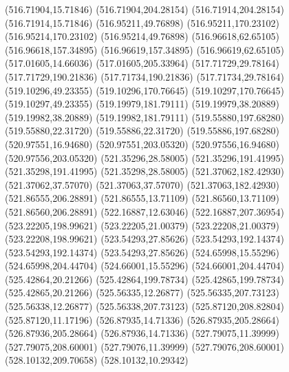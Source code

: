 {(516.71904,15.71846) (516.71904,204.28154) (516.71914,204.28154) (516.71914,15.71846) (516.95211,49.76898) (516.95211,170.23102) (516.95214,170.23102) (516.95214,49.76898)
(516.96618,62.65105) (516.96618,157.34895) (516.96619,157.34895) (516.96619,62.65105) (517.01605,14.66036) (517.01605,205.33964) (517.71729,29.78164) (517.71729,190.21836)
(517.71734,190.21836) (517.71734,29.78164) (519.10296,49.23355) (519.10296,170.76645) (519.10297,170.76645) (519.10297,49.23355) (519.19979,181.79111) (519.19979,38.20889)
(519.19982,38.20889) (519.19982,181.79111) (519.55880,197.68280) (519.55880,22.31720) (519.55886,22.31720) (519.55886,197.68280) (520.97551,16.94680) (520.97551,203.05320)
(520.97556,16.94680) (520.97556,203.05320) (521.35296,28.58005) (521.35296,191.41995) (521.35298,191.41995) (521.35298,28.58005) (521.37062,182.42930) (521.37062,37.57070)
(521.37063,37.57070) (521.37063,182.42930) (521.86555,206.28891) (521.86555,13.71109) (521.86560,13.71109) (521.86560,206.28891) (522.16887,12.63046) (522.16887,207.36954)
(523.22205,198.99621) (523.22205,21.00379) (523.22208,21.00379) (523.22208,198.99621) (523.54293,27.85626) (523.54293,192.14374) (523.54293,192.14374) (523.54293,27.85626)
(524.65998,15.55296) (524.65998,204.44704) (524.66001,15.55296) (524.66001,204.44704) (525.42864,20.21266) (525.42864,199.78734) (525.42865,199.78734) (525.42865,20.21266)
(525.56335,12.26877) (525.56335,207.73123) (525.56338,12.26877) (525.56338,207.73123) (525.87120,208.82804) (525.87120,11.17196) (526.87935,14.71336) (526.87935,205.28664)
(526.87936,205.28664) (526.87936,14.71336) (527.79075,11.39999) (527.79075,208.60001) (527.79076,11.39999) (527.79076,208.60001) (528.10132,209.70658) (528.10132,10.29342)
}
